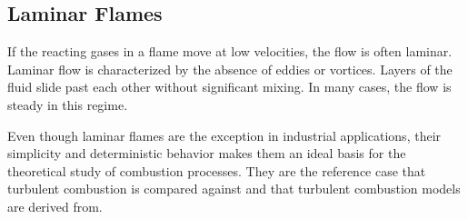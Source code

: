\subsection{Laminar Flames} %
\label{sub:laminar_flames}
%
If the reacting gases in a flame move at low velocities, the flow is often
laminar.
%
Laminar flow is characterized by the absence of eddies or vortices.
%
Layers of the fluid slide past each other without significant mixing.
%
In many cases, the flow is steady in this regime.
%

%
Even though laminar flames are the exception in industrial applications, their
simplicity and deterministic behavior makes them an ideal basis for the
theoretical study of combustion processes.
%
They are the reference case that turbulent combustion is compared against and
that turbulent combustion models are derived from.
%
